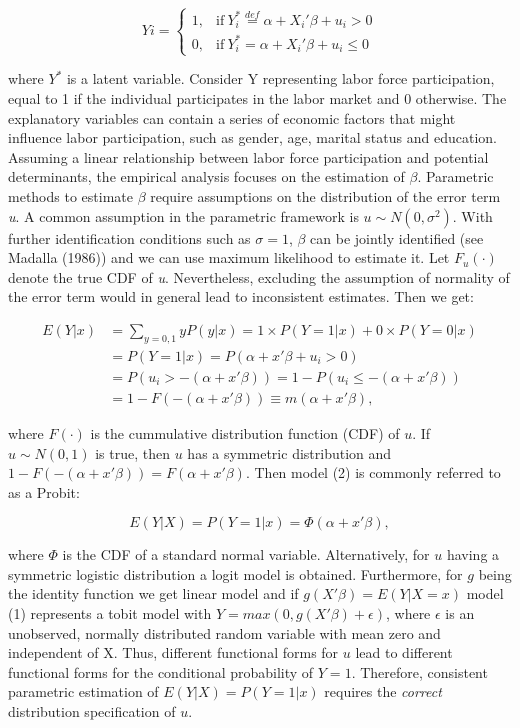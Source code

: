 \documentclass[a4paper]{article}
\begin{document}
\[
    Yi = 
    \begin{cases}
      1, & \text{if}\ Y_i^* \stackrel{def}{=} \alpha + X_i'\beta + u_i > 0 \\
      0, & \text{if}\ Y_i^* = \alpha + X_i'\beta + u_i \leq 0
    \end{cases}
\]

where $Y^{*}$ is a latent variable.
Consider Y representing labor force participation, equal to 1 if the individual participates in the labor market and 0 otherwise. The explanatory variables can contain a series of economic factors that might influence labor participation, such as gender, age, marital status and education. Assuming a linear relationship between labor force participation and potential determinants, the empirical analysis focuses on the estimation of $\beta$.
Parametric methods to estimate $\beta$ require assumptions on the distribution of the error term \textit{u}. A common assumption in the parametric framework is $ u \sim N(0, \sigma^{2})$. With further identification conditions such as $\sigma = 1$, $\beta$ can be jointly identified (see Madalla (1986)) and we can use maximum likelihood to estimate it.  Let $F_u(\cdot)$ denote the true CDF of \textit{u}. Nevertheless, excluding the assumption of normality of the error term would in general lead to inconsistent estimates. Then we get:


\[ 
\begin{split}
E(Y|x) & = \sum_{y=0,1} yP(y|x) = 1 \times P(Y=1|x) + 0 \times P(Y=0|x) \\
 & = P(Y=1|x) = P(\alpha + x'\beta + u_i > 0) \\
 & = P(u_i > -(\alpha + x'\beta)) = 1 - P(u_i \leq -(\alpha + x'\beta)) \\
 & = 1 - F(-(\alpha + x'\beta)) \equiv m(\alpha + x'\beta),
\end{split}
\]


where $F(\cdot)$ is the cummulative distribution function (CDF) of $u$. If $ u \sim N(0,1)$ is true, then $u$ has a symmetric distribution and $1 - F(-(\alpha + x'\beta)) = F(\alpha + x'\beta)$. Then model (2) is commonly referred to as a Probit:

\[
E(Y|X) = P(Y=1|x) = \Phi(\alpha + x'\beta),
\]

where $\Phi$ is the CDF of a standard normal variable. Alternatively, for $u$ having a symmetric logistic distribution a logit model is obtained. Furthermore, for $g$ being the identity function we get linear model and if $g(X'\beta) = E(Y|X=x)$ model (1) represents a tobit model with $Y = max (0, g(X'\beta) + \epsilon)$, where $\epsilon$ is an unobserved, normally distributed random variable with mean zero and independent of X. 
Thus, different functional forms for $u$ lead to different functional forms for the conditional probability of $Y = 1$. Therefore, consistent parametric estimation of $E(Y|X) = P(Y=1|x)$ requires the \textit{correct} distribution specification of $u$.
\end{document}
